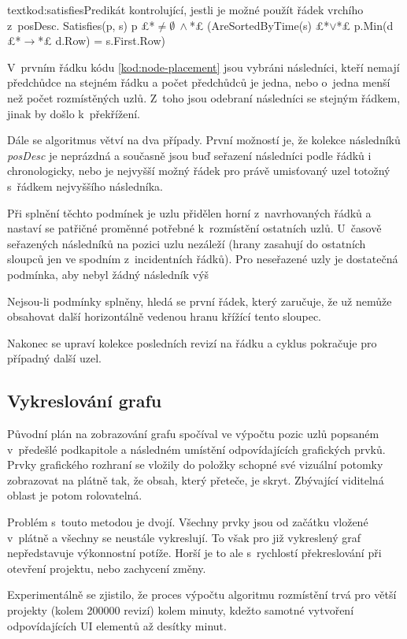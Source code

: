 \documentclass[
  biblatex,
  glossaries,
  index
]{kidiplom}
\begin{document}
\begin{kicode}{text}{kod:satisfies}{Predikát kontrolující, jestli je možné použít řádek vrchího z~posDesc.}
Satisfies(p, s)
	p £*$\neq\emptyset\ \wedge{}$*£ (AreSortedByTime(s) £*$\vee$*£ p.Min(d £*$\to$*£ d.Row) = s.First.Row)
\end{kicode}

V~prvním řádku kódu \ref{kod:node-placement} jsou vybráni následníci, kteří nemají předchůdce na stejném řádku a počet předchůdců je jedna, nebo o~jedna menší než počet rozmístěných uzlů. Z~toho jsou odebraní následníci se stejným řádkem, jinak by došlo k~překřížení.

Dále se algoritmus větví na dva případy. První možností je, že kolekce následníků {\it posDesc} je neprázdná a současně jsou buď seřazení následníci podle řádků i chronologicky, nebo je nejvyšší možný řádek pro právě umisťovaný uzel totožný s~řádkem nejvyššího následníka.

Při splnění těchto podmínek je uzlu přidělen horní z~navrhovaných řádků a nastaví se patřičné proměnné potřebné k~rozmístění ostatních uzlů. U~časově seřazených následníků na pozici uzlu nezáleží (hrany zasahují do ostatních sloupců jen ve spodním z~incidentních řádků). Pro neseřazené uzly je dostatečná podmínka, aby nebyl žádný následník výš

Nejsou-li podmínky splněny, hledá se první řádek, který zaručuje, že už nemůže obsahovat další horizontálně vedenou hranu křížící tento sloupec.

Nakonec se upraví kolekce posledních revizí na řádku a cyklus pokračuje pro případný další uzel.

\subsection{Vykreslování grafu}
Původní plán na zobrazování grafu spočíval ve výpočtu pozic uzlů popsaném v~předešlé podkapitole a následném umístění odpovídajících grafických prvků. Prvky grafického rozhraní se vložily do položky schopné své vizuální potomky zobrazovat na plátně tak, že obsah, který přeteče, je skryt. Zbývající viditelná oblast je potom rolovatelná.

Problém s~touto metodou je dvojí. Všechny prvky jsou od začátku vložené v~plátně a všechny se neustále vykreslují. To však pro již vykreslený graf nepředstavuje výkonnostní potíže. Horší je to ale s~rychlostí překreslování při otevření projektu, nebo zachycení změny.

Experimentálně se zjistilo, že proces výpočtu algoritmu rozmístění trvá pro větší projekty (kolem 200000 revizí) kolem minuty, kdežto samotné vytvoření odpovídajících UI elementů až desítky minut.
\end{document}
